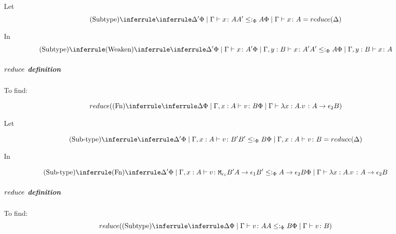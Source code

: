 {        Let 
        \begin{equation}\label{WeakenDeltaReduction}
            \ntreeruleII{Subtype}{\treeruleI{\D'}{\gpetyperelation{x}{A}} }{  A'\subtypep A}{\gpetyperelation{x}{A}} = \reduce(\D)
        \end{equation}

        In 
        \begin{equation}
            \ntreeruleII{Subtype}{
            \ntreeruleI{Weaken}{
                \treeruleI{\D'}{\gpetyperelation{x}{A'}}
            } {
                \etyperelation{\P}{\gby}{x}{A'}
            }
             }{ 
            A' \subtypep A
            }{\etyperelation{\P}{\gby}{x}{A}}
        \end{equation}

        \subparagraph{$reduce$ definition}
            To find:
        
            \begin{equation}
                \reduce(\ntreeruleI{Fn}{
                    \treeruleI{\D}{\etyperelation{\P}{\gax}{v}{B}}
                }{\gpetyperelation{\lam{x}{A}{v}}{\fntype{A}{\e_2}{B}}})
            \end{equation}

            Let 

            \begin{equation}
                \ntreeruleII{Sub-type}{
                    \treeruleI{\D'}{\etyperelation{\P}{\gax}{v}{B'}}
                     }{ 
                    B' \subtypep B
                }{
                    \etyperelation{\P}{\gax}{v}{B}
                } = \reduce(\D)
            \end{equation}

            In

            \begin{equation}
                \ntreeruleII{Sub-type}{
                    \ntreeruleI{Fn}{
                        \D'
                    }{
                        \etyperelation{\P}{\gax}{v}{\M{\e_1}{B'}}
                    }
                     }{ 
                    \fntype{A}{\e_1}{B'}\subtypep\fntype{A}{\e_2}{B}
                } {
                    \gpetyperelation{\lam{x}{A}{v}}{\fntype{A}{\e_2}{B}}
                }
            \end{equation}

        \subparagraph{$reduce$ definition}
        To find:
        \begin{equation}
            \reduce(\ntreeruleII{Subtype}{\treeruleI{\D}{\gpetyperelation{v}{A}} }{  A \subtypep B}{\gpetyperelation{v}{B}})
        \end{equation}

}
